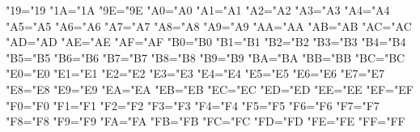 \lccode"19="19 %
\lccode"1A="1A %
\lccode"9E="9E %
\lccode"A0="A0 %
\lccode"A1="A1 %
\lccode"A2="A2 %
\lccode"A3="A3 %
\lccode"A4="A4 %
\lccode"A5="A5 %
\lccode"A6="A6 %
\lccode"A7="A7 %
\lccode"A8="A8 %
\lccode"A9="A9 %
\lccode"AA="AA %
\lccode"AB="AB %
\lccode"AC="AC %
\lccode"AD="AD %
\lccode"AE="AE %
\lccode"AF="AF %
\lccode"B0="B0 %
\lccode"B1="B1 %
\lccode"B2="B2 %
\lccode"B3="B3 %
\lccode"B4="B4 %
\lccode"B5="B5 %
\lccode"B6="B6 %
\lccode"B7="B7 %
\lccode"B8="B8 %
\lccode"B9="B9 %
\lccode"BA="BA %
\lccode"BB="BB %
\lccode"BC="BC %
\lccode"E0="E0 %
\lccode"E1="E1 %
\lccode"E2="E2 %
\lccode"E3="E3 %
\lccode"E4="E4 %
\lccode"E5="E5 %
\lccode"E6="E6 %
\lccode"E7="E7 %
\lccode"E8="E8 %
\lccode"E9="E9 %
\lccode"EA="EA %
\lccode"EB="EB %
\lccode"EC="EC %
\lccode"ED="ED %
\lccode"EE="EE %
\lccode"EF="EF %
\lccode"F0="F0 %
\lccode"F1="F1 %
\lccode"F2="F2 %
\lccode"F3="F3 %
\lccode"F4="F4 %
\lccode"F5="F5 %
\lccode"F6="F6 %
\lccode"F7="F7 %
\lccode"F8="F8 %
\lccode"F9="F9 %
\lccode"FA="FA %
\lccode"FB="FB %
\lccode"FC="FC %
\lccode"FD="FD %
\lccode"FE="FE %
\lccode"FF="FF %

